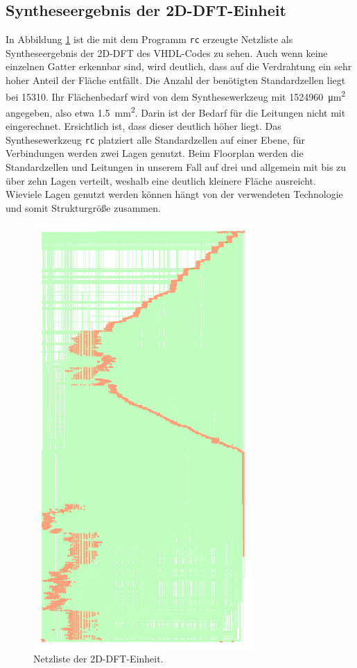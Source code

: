 \subsection{Syntheseergebnis der 2D-DFT-Einheit}
 In Abbildung \ref{pic:Netzliste2D-DFT} ist die mit dem Programm \texttt{rc} erzeugte Netzliste als Syntheseergebnis der 2D-DFT des VHDL-Codes zu sehen.
 Auch wenn keine einzelnen Gatter erkennbar sind, wird deutlich, dass auf die Verdrahtung ein sehr hoher Anteil der Fläche entfällt.
 Die Anzahl der benötigten Standardzellen liegt bei \num{15310}. Ihr Flächenbedarf wird von dem Synthesewerkzeug mit \SI{1524960}{\um^2} angegeben, also etwa 
 \SI{1,5}{mm^2}. Darin ist der Bedarf für die Leitungen nicht mit eingerechnet. Ersichtlich ist, dass dieser deutlich höher liegt. 
 Das Synthesewerkzeug \texttt{rc} platziert alle Standardzellen auf einer Ebene, für Verbindungen werden zwei Lagen genutzt.
 Beim Floorplan werden die Standardzellen und Leitungen in unserem Fall auf drei und allgemein mit bis zu über zehn Lagen verteilt,
 weshalb eine deutlich kleinere Fläche ausreicht. Wieviele Lagen genutzt werden können hängt von der verwendeten Technologie und somit Strukturgröße zusammen.
 
    \begin{figure}[ht!]
     \centering
     \includegraphics[width=0.75\textwidth]{img/2D-DFT.png}
     \caption{Netzliste der 2D-DFT-Einheit.}
     \label{pic:Netzliste2D-DFT}
    \end{figure} 
 

